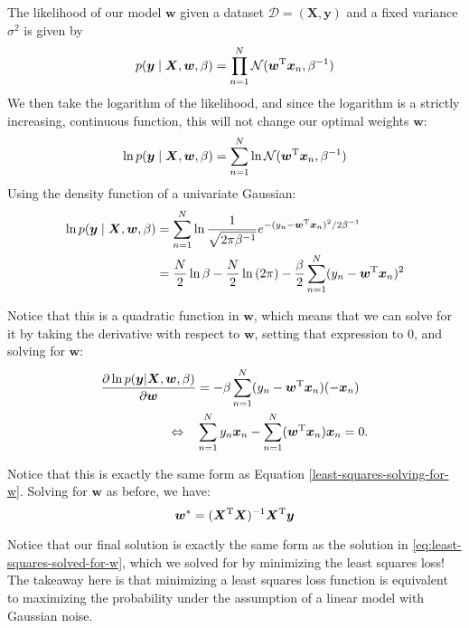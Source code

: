 \begin{derivation}
    The likelihood of our model $\bm{w}$ given a dataset $\mathcal D = (\bm{X}, \bm{y})$ and a fixed variance $\sigma^2$ is given by
    \begin{align*}
        p(\bm{y} \mid \bm{X}, \bm{w}, \beta) = \prod_{n=1}^{N} \mathcal{N}(\bm{w}^{\mathrm T}\bm{x}_n, \beta^{-1})
    \end{align*}
    We then take the logarithm of the likelihood, and since the logarithm is a strictly increasing, continuous function, this will not change our optimal weights $\bm{w}$:
    \begin{align*}
        \ln{p(\bm{y} \mid \bm{X}, \bm{w}, \beta)} = \sum_{n=1}^{N} \ln{\mathcal{N}(\bm{w}^{\mathrm T}\bm{x}_n, \beta^{-1})}
    \end{align*}
    Using the density function of a univariate Gaussian:
    \begin{align*}
        \ln{p(\bm{y} \mid \bm{X}, \bm{w}, \beta)} &= \sum_{n=1}^{N} \ln{\frac{1}{\sqrt{2\pi\beta^{-1}}} e^{-(y_n - \bm{w}^{\mathrm T}\bm{x}_n)^2 / 2\beta^{-1}}} \\
        &= \frac{N}{2}\ln{\beta} - \frac{N}{2}\ln{(2\pi)} - \frac{\beta}{2} \sum_{n=1}^{N} (y_n - \bm{w}^{\mathrm T}\bm{x}_n)^2
    \end{align*}

    Notice that this is a quadratic function in $\bm{w}$, which means that we can solve for it by taking the derivative with respect to $\bm{w}$, setting that expression to 0, and solving for $\bm{w}$:
    \begin{align*}
      \frac{\partial \ln{p(\bm{y} | \bm{X}, \bm{w}, \beta)}}{\partial \bm{w}} & = -  \beta \sum_{n=1}^{N} (y_n - \bm{w}^{\mathrm T}\bm{x}_n)(-\bm{x}_n)
      \\
      \Leftrightarrow \quad & 
      \sum_{n=1}^{N} y_n \bm{x}_n - \sum_{n=1}^N (\bm{w}^{\mathrm T}\bm{x}_n)\bm{x}_n=0.
    \end{align*}

    Notice that this is exactly the same form as Equation \ref{least-squares-solving-for-w}. Solving for $\bm{w}$ as before, we have:
    \begin{equation}
        \label{eq:mle-solved-for-w}
        \bm{w}^* = (\bm{X}^{\mathrm T}\bm{X})^{-1}\bm{X}^{\mathrm T}\bm{y}
    \end{equation}
\end{derivation}

Notice that our final solution is exactly the same form as the solution in \autoref{eq:least-squares-solved-for-w}, which we solved for by minimizing the least squares loss! The takeaway here is that minimizing a least squares loss function is equivalent to maximizing the probability under the assumption of a linear model with Gaussian noise.

